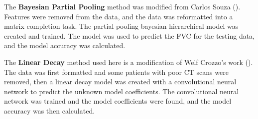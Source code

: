 \documentclass[12pt]{article}
\begin{document}

The \textbf{Bayesian Partial Pooling} method was modified from Carlos Souza (\cite{bayesian}). 
Features were removed from the data, and the data was reformatted into a matrix completion task.
The partial pooling bayesian hierarchical model was created and trained.
The model was used to predict the FVC for the testing data, and the model accuracy was calculated.





The \textbf{Linear Decay} method used here is a modification of Welf Crozzo's work (\cite{lineardecay}).
The data was first formatted and some patients with poor CT scans were removed, then a linear decay model was created with a convolutional neural network to predict the unknown model coefficients.
The convolutional neural network was trained and the model coefficients were found, and the model accuracy was then calculated.
\end{document}
